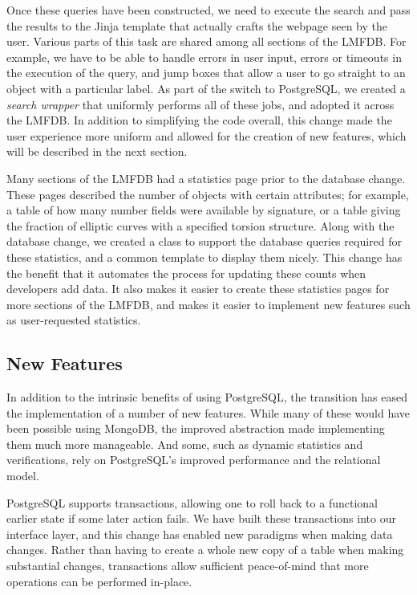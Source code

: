 \documentclass{amsart}
\begin{document}
Once these queries have been constructed, we need to execute the search and pass the results to the Jinja template that actually crafts the webpage seen by the user.
Various parts of this task are shared among all sections of the LMFDB.
For example, we have to be able to handle errors in user input, errors or timeouts in the execution of the query, and jump boxes that allow a user to go straight to an object with a particular label.
As part of the switch to PostgreSQL, we created a \emph{search wrapper} that uniformly performs all of these jobs, and adopted it across the LMFDB.
In addition to simplifying the code overall, this change made the user experience more uniform and allowed for the creation of new features, which will be described in the next section.

Many sections of the LMFDB had a statistics page prior to the database change.
These pages described the number of objects with certain attributes; for example, a table of how many number fields were available by signature, or a table giving the fraction of elliptic curves with a specified torsion structure.
Along with the database change, we created a class to support the database queries required for these statistics, and a common template to display them nicely.
This change has the benefit that it automates the process for updating these counts when developers add data.
It also makes it easier to create these statistics pages for more sections of the LMFDB, and makes it easier to implement new features such as user-requested statistics.

\subsection{New Features}


In addition to the intrinsic benefits of using PostgreSQL, the transition has eased the implementation of a number of new features.
While many of these would have been possible using MongoDB, the improved abstraction made implementing them much more manageable.
And some, such as dynamic statistics and verifications, rely on PostgreSQL's improved performance and the relational model.

PostgreSQL supports transactions, allowing one to roll back to a functional earlier state if some later action fails.
We have built these transactions into our interface layer, and this change has enabled new paradigms when making data changes.
Rather than having to create a whole new copy of a table when making substantial changes, transactions allow sufficient peace-of-mind that more operations can be performed in-place.
\end{document}
